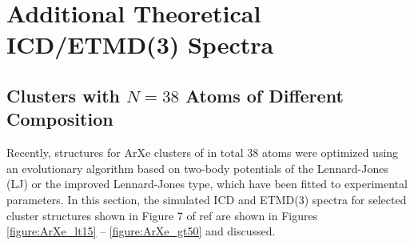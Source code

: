 \section{Additional Theoretical ICD/ETMD(3) Spectra}

\subsection{Clusters with $N=38$ Atoms of Different Composition}
Recently, structures for ArXe clusters of in total 38 atoms were optimized
using an evolutionary algorithm based on two-body potentials of the
Lennard-Jones (LJ) or the improved Lennard-Jones type,\cite{marques,Pirani08}
which have been fitted to experimental parameters.
In this section, the simulated ICD and ETMD(3) spectra for selected cluster
structures shown in Figure 7 of ref  are shown in Figures
\ref{figure:ArXe_lt15} -- \ref{figure:ArXe_gt50} and discussed.


